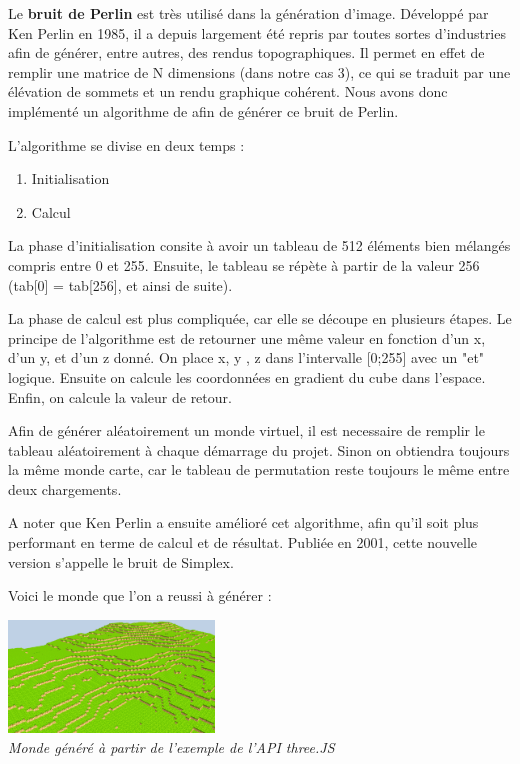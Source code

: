 ﻿Le \textbf{bruit de Perlin} est très utilisé dans la génération d'image. Développé par Ken Perlin en 1985, il a depuis largement été repris par toutes sortes d'industries afin de générer, entre autres, des rendus topographiques.	Il permet en effet de remplir une matrice de N dimensions (dans notre cas 3), ce qui se traduit par une élévation de sommets et un rendu graphique cohérent. Nous avons donc implémenté un algorithme de afin de générer ce bruit de Perlin. 

L'algorithme se divise en deux temps :

\begin{enumerate}
	\item Initialisation
	\item Calcul
\end{enumerate}

La phase d'initialisation consite à avoir un tableau de 512 éléments bien mélangés compris entre 0 et 255. Ensuite, le tableau se répète à partir de la valeur 256 (tab[0] = tab[256], et ainsi de suite). 

La phase de calcul est plus compliquée, car elle se découpe en plusieurs étapes. Le principe de l'algorithme est de retourner une même valeur en fonction d'un x, d'un y, et d'un z donné. On place x, y , z dans l'intervalle [0;255] avec un "et" logique. Ensuite on calcule les coordonnées en gradient du cube dans l'espace. Enfin, on calcule la valeur de retour. 

Afin de générer aléatoirement un monde virtuel, il est necessaire de remplir le tableau aléatoirement à chaque démarrage du projet. Sinon on obtiendra toujours la même monde carte, car le tableau de permutation reste toujours le même entre deux chargements.

A noter que Ken Perlin a ensuite amélioré cet algorithme, afin qu'il soit plus performant en terme de calcul et de résultat. Publiée en 2001, cette nouvelle version s'appelle le bruit de Simplex.

\newpage
Voici le monde que l'on a reussi à générer :

\begin{center}
	\null\vspace{0.25cm}
	\includegraphics[height=3cm]{images/OurMinecraftWorld.png}\\
	\textit{Monde généré à partir de l'exemple de l'API three.JS}\\
\end{center}
